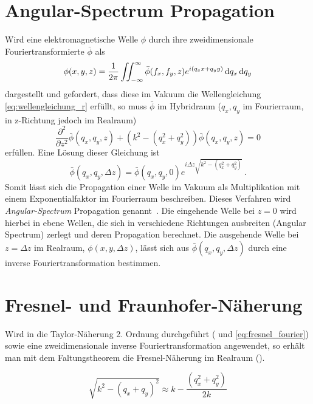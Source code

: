 \section{Angular-Spectrum Propagation}
Wird eine elektromagnetische Welle $\phi$ durch ihre zweidimensionale Fouriertransformierte $\bar{\phi}$ als
\begin{equation}
	\phi(x,y,z)=\frac{1}{2\pi}\iint_{-\infty}^{\infty}\bar{\phi}(f_x,f_y,z)e^{i(q_xx+q_yy)} \dif q_x \dif q_y
\end{equation}dargestellt und gefordert, dass diese im Vakuum die Wellengleichung \ref{eq:wellengleichung_r} erfüllt,
so muss $\bar{\phi}$ im Hybridraum ($q_x,q_y$ im Fourierraum, in z-Richtung jedoch im Realraum)
\begin{equation}
	\label{eq:wellengleichung_h}
	\frac{\partial ^2}{\partial z^2}\bar{\phi}(q_x,q_y,z)+ \left(k^2-\left(q_x^2+q_y^2\right)\right)\bar{\phi}(q_x,q_y,z)=0
\end{equation}
erfüllen. Eine Lösung dieser Gleichung ist
\begin{equation}
	\label{eq:angularspectrum}
	\bar{\phi}\left(q_x,q_y,\Delta z\right)=\bar{\phi}(q_x,q_y,0)e^{i\Delta z\sqrt{k^2-(q_x^2+q_y^2)}}\, . 
\end{equation}
Somit lässt sich die Propagation einer Welle im Vakuum als Multiplikation mit einem Exponentialfaktor im Fourierraum beschreiben. Dieses Verfahren wird \textit{Angular-Spectrum} Propagation genannt~\cite{goodman2005}. Die eingehende Welle bei $z=0$ wird hierbei in ebene Wellen, die sich in verschiedene Richtungen ausbreiten (Angular Spectrum) zerlegt und deren Propagation berechnet. Die ausgehende Welle bei $z=\Delta z$ im Realraum, $\phi\left(x,y,\Delta z\right)$, lässt sich aus $\bar{\phi}\left(q_x,q_y,\Delta z\right)$ durch eine inverse Fouriertransformation bestimmen.


\section{Fresnel- und Fraunhofer-Näherung}
\label{chap:fraunhofer}
Wird in  die Taylor-Näherung 2. Ordnung durchgeführt ( und \ref{eq:fresnel_fourier}) sowie eine zweidimensionale inverse Fouriertransformation angewendet, so erhält man mit dem Faltungstheorem die Fresnel-Näherung im Realraum ().

\begin{equation}
\label{eq:taylor}
\sqrt{k^2-(q_x+q_y)^2}\approx k-\frac{(q_x^2+q_y^2)}{2k}
\end{equation}

